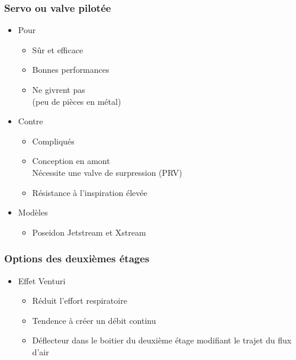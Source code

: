 \documentclass[aspectratio=1610,english,12pt]{beamer}
\begin{document}
\subsubsection{Servo ou valve pilotée}
\begin{frame}{\insertsubsubsection}
\end{frame}

\begin{frame}{\insertsubsubsection}
	\begin{itemize}
		\item Pour
		\begin{itemize}
			\item Sûr et efficace
			\item Bonnes performances
			\item Ne givrent pas \\ (peu de pièces en métal)
		\end{itemize}
		\item Contre
		\begin{itemize}
			\item Compliqués
			\item Conception en amont \\ Nécessite une valve de surpression (PRV)
			\item Résistance à l'inspiration élevée
		\end{itemize}
	\end{itemize}
\end{frame}

\begin{frame}{\insertsubsubsection}
	\begin{itemize}
		\item Modèles
		\begin{itemize}
			\item Poseidon Jetstream et Xstream
		\end{itemize}
	\end{itemize}
\end{frame}

\subsubsection{Options des deuxièmes étages}
\begin{frame}{\insertsubsubsection}
	\begin{itemize}
		\item Effet Venturi
		\begin{itemize}
			\item Réduit l'effort respiratoire
			\item Tendence à créer un débit continu
			\item Déflecteur dans le boitier du deuxième étage modifiant le trajet du flux d'air
		\end{itemize}
	\end{itemize}
\end{frame}
\end{document}
